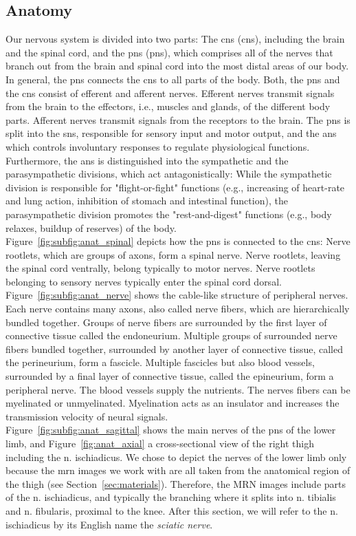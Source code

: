 \subsection{Anatomy}
Our nervous system is divided into two parts: The \acrlong{cns} (\acrshort{cns}), including the brain and the spinal cord, and the \acrlong{pns} (\acrshort{pns}), which comprises all of the nerves that branch out from the brain and spinal cord into the most distal areas of our body. In general, the \gls{pns} connects the \gls{cns} to all parts of the body. Both, the \gls{pns} and the \gls{cns} consist of efferent and afferent nerves. Efferent nerves transmit signals from the brain to the effectors, i.e., muscles and glands, of the different body parts. Afferent nerves transmit signals from the receptors to the brain. The \gls{pns} is split into the \gls{sns}, responsible for sensory input and motor output, and the \gls{ans} which controls involuntary responses to regulate physiological functions. Furthermore, the \gls{ans} is distinguished into the sympathetic and the parasympathetic divisions, which act antagonistically: While the sympathetic division is responsible for "flight-or-fight" functions (e.g., increasing of heart-rate and lung action, inhibition of stomach and intestinal function), the parasympathetic division promotes the "rest-and-digest" functions (e.g., body relaxes, buildup of reserves) of the body.\\
Figure~\ref{fig:subfig:anat_spinal} depicts how the \gls{pns} is connected to the \gls{cns}: Nerve rootlets, which are groups of axons, form a spinal nerve. Nerve rootlets, leaving the spinal cord ventrally, belong typically to motor nerves. Nerve rootlets belonging to sensory nerves typically enter the spinal cord dorsal. Figure~\ref{fig:subfig:anat_nerve} shows the cable-like structure of peripheral nerves. Each nerve contains many axons, also called nerve fibers, which are hierarchically bundled together. Groups of nerve fibers are surrounded by the first layer of connective tissue called the endoneurium. Multiple groups of surrounded nerve fibers bundled together, surrounded by another layer of connective tissue, called the perineurium, form a fascicle. Multiple fascicles but also blood vessels, surrounded by a final layer of connective tissue, called the epineurium, form a peripheral nerve. The blood vessels supply the nutrients. The nerves fibers can be myelinated or unmyelinated. Myelination acts as an insulator and increases the transmission velocity of neural signals.\\
Figure~\ref{fig:subfig:anat_sagittal} shows the main nerves of the \gls{pns} of the lower limb, and  Figure~\ref{fig:anat_axial} a cross-sectional view of the right thigh including the \gls{n.} ischiadicus. We chose to depict the nerves of the lower limb only because the \acrshort{mrn} images we work with are all taken from the anatomical region of the thigh (see Section~\ref{sec:materials}). Therefore, the MRN images include parts of the \gls{n.} ischiadicus, and typically the branching where it splits into \gls{n.} tibialis and \gls{n.} fibularis, proximal to the knee. After this section, we will refer to the \gls{n.} ischiadicus by its English name the \textit{sciatic nerve}.


